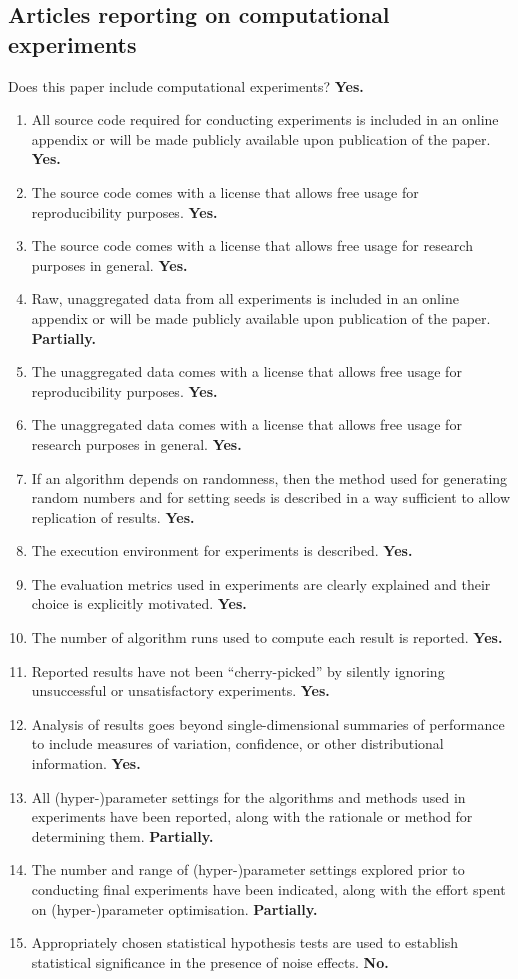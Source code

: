\subsection*{Articles reporting on computational experiments}

Does this paper include computational experiments? \textbf{Yes.}

\begin{enumerate}[leftmargin=1.8em,itemsep=1pt]
\item All source code required for conducting experiments is included in an online appendix or will be made publicly available upon publication of the paper. \textbf{Yes.}
\item The source code comes with a license that allows free usage for reproducibility purposes. \textbf{Yes.}
\item The source code comes with a license that allows free usage for research purposes in general. \textbf{Yes.}
\item Raw, unaggregated data from all experiments is included in an online appendix or will be made publicly available upon publication of the paper. \textbf{Partially.}
\item The unaggregated data comes with a license that allows free usage for reproducibility purposes. \textbf{Yes.}
\item The unaggregated data comes with a license that allows free usage for research purposes in general. \textbf{Yes.}
\item If an algorithm depends on randomness, then the method used for generating random numbers and for setting seeds is described in a way sufficient to allow replication of results. \textbf{Yes.}
\item The execution environment for experiments is described. \textbf{Yes.}
\item The evaluation metrics used in experiments are clearly explained and their choice is explicitly motivated. \textbf{Yes.}
\item The number of algorithm runs used to compute each result is reported. \textbf{Yes.}
\item Reported results have not been ``cherry-picked'' by silently ignoring unsuccessful or unsatisfactory experiments. \textbf{Yes.}
\item Analysis of results goes beyond single-dimensional summaries of performance to include measures of variation, confidence, or other distributional information. \textbf{Yes.}
\item All (hyper-)parameter settings for the algorithms and methods used in experiments have been reported, along with the rationale or method for determining them. \textbf{Partially.}
\item The number and range of (hyper-)parameter settings explored prior to conducting final experiments have been indicated, along with the effort spent on (hyper-)parameter optimisation. \textbf{Partially.}
\item Appropriately chosen statistical hypothesis tests are used to establish statistical significance in the presence of noise effects. \textbf{No.}
\end{enumerate}

